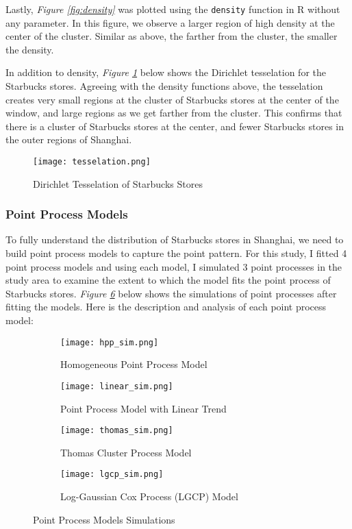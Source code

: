 \documentclass{article}
\begin{document}
Lastly, \textit{Figure \ref{fig:density}} was plotted using the \texttt{density} function in R without any parameter. In this figure, we observe a larger region of high density at the center of the cluster. Similar as above, the farther from the cluster, the smaller the density.

In addition to density, \textit{Figure \ref{fig:tesselation}} below shows the Dirichlet tesselation for the Starbucks stores. Agreeing with the density functions above, the tesselation creates very small regions at the cluster of Starbucks stores at the center of the window, and large regions as we get farther from the cluster. This confirms that there is a cluster of Starbucks stores at the center, and fewer Starbucks stores in the outer regions of Shanghai.

\begin{figure}[htbp]
    \centering
    \texttt{[image: tesselation.png]}
    \caption{Dirichlet Tesselation of Starbucks Stores}
    \label{fig:tesselation}
\end{figure}

\subsubsection{Point Process Models}

To fully understand the distribution of Starbucks stores in Shanghai, we need to build point process models to capture the point pattern. For this study, I fitted 4 point process models and using each model, I simulated 3 point processes in the study area to examine the extent to which the model fits the point process of Starbucks stores. \textit{Figure \ref{fig:sims}} below shows the simulations of point processes after fitting the models. Here is the description and analysis of each point process model:

\begin{figure}[htbp]
    \begin{subfigure}[b]{0.48\textwidth}
        \centering
        \texttt{[image: hpp\_sim.png]}
        \caption{Homogeneous Point Process Model}
        \label{fig:hppm}
    \end{subfigure}
    \hfill
    \begin{subfigure}[b]{0.48\textwidth}
        \centering
        \texttt{[image: linear\_sim.png]}
        \caption{Point Process Model with Linear Trend}
        \label{fig:linear_ppm}
    \end{subfigure}
    \hfill
    \begin{subfigure}[b]{0.48\textwidth}
        \centering
        \texttt{[image: thomas\_sim.png]}
        \caption{Thomas Cluster Process Model}
        \label{fig:thomas_ppm}
    \end{subfigure}
    \hfill
    \begin{subfigure}[b]{0.48\textwidth}
        \centering
        \texttt{[image: lgcp\_sim.png]}
        \caption{Log-Gaussian Cox Process (LGCP) Model}
        \label{fig:lgcp_ppm}
    \end{subfigure}
    \caption{Point Process Models Simulations}
    \label{fig:sims}
\end{figure}
\end{document}
